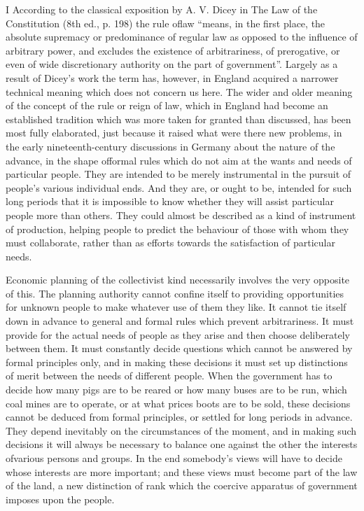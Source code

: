 \documentclass[11pt,openany]{book}
\begin{document}
I According to the classical exposition by A. V. Dicey in The Law of the Constitution (8th ed., p. 198) the rule oflaw ``means, in the first place, the absolute supremacy or predominance of regular law as opposed to the influence of arbitrary power, and excludes the existence of arbitrariness, of prerogative, or even of wide discretionary authority on the part of government''. Largely as a result of Dicey's work the term has, however, in England acquired a narrower technical meaning which does not concern us here. The wider and older meaning of the concept of the rule or reign of law, which in England had become an established tradition which was more taken for granted than discussed, has been most fully elaborated, just because it raised what were there new problems, in the early nineteenth-century discussions in Germany about the nature of the advance, in the shape offormal rules which do not aim at the wants and needs of particular people. They are intended to be merely instrumental in the pursuit of people's various individual ends. And they are, or ought to be, intended for such long periods that it is impossible to know whether they will assist particular people more than others. They could almost be described as a kind of instrument of production, helping people to predict the behaviour of those with whom they must collaborate, rather than as efforts towards the satisfaction of particular needs.

Economic planning of the collectivist kind necessarily involves the very opposite of this. The planning authority cannot confine itself to providing opportunities for unknown people to make whatever use of them they like. It cannot tie itself down in advance to general and formal rules which prevent arbitrariness. It must provide for the actual needs of people as they arise and then choose deliberately between them. It must constantly decide questions which cannot be answered by formal principles only, and in making these decisions it must set up distinctions of merit between the needs of different people. When the government has to decide how many pigs are to be reared or how many buses are to be run, which coal mines are to operate, or at what prices boots are to be sold, these decisions cannot be deduced from formal principles, or settled for long periods in advance. They depend inevitably on the circumstances of the moment, and in making such decisions it will always be necessary to balance one against the other the interests ofvarious persons and groups. In the end somebody's views will have to decide whose interests are more important; and these views must become part of the law of the land, a new distinction of rank which the coercive apparatus of government imposes upon the people.
\end{document}
